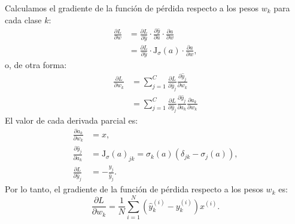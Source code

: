 \documentclass[a4,11pt]{aleph-notas}
\begin{document}
Calculamos el gradiente de la función de pérdida respecto a los pesos $ w_k $ para cada clase $ k $:
$$\begin{aligned}
    \frac{\partial L}{\partial w} & 
    = \frac{\partial L}{\partial \hat{y}}\cdot \frac{\partial \hat{y}}{\partial a} \cdot\frac{\partial a}{\partial w}\\
    &= \frac{\partial L}{\partial \hat{y}}\cdot \text{J}_{\sigma}(a) \cdot\frac{\partial a}{\partial w},
\end{aligned}$$
o, de otra forma:
$$\begin{aligned}
\frac{\partial L}{\partial w_k}  
    &= \sum_{j=1}^C \frac{\partial L}{\partial \hat{y}_j} \frac{\partial \hat{y}_j}{\partial w_k}\\
    &= \sum_{j=1}^C \frac{\partial L}{\partial \hat{y}_j} \frac{\partial \hat{y}_j}{\partial a_k} \frac{\partial a_k}{\partial w_k}
\end{aligned}$$
El valor de cada derivada parcial es:
$$\begin{aligned}
    \frac{\partial a_k}{\partial w_k} &= x,\\
    \frac{\partial \hat{y}_j}{\partial a_k} &= \text{J}_{\sigma}(a)_{jk} = \sigma_k(a)(\delta_{jk} - \sigma_j(a)),\\
    \frac{\partial L}{\partial \hat{y}_j} &= - \frac{y_j}{\hat{y}_j}.
\end{aligned}$$
Por lo tanto, el gradiente de la función de pérdida respecto a los pesos $w_k$ es:
$$
\frac{\partial L}{\partial w_k} = \frac{1}{N} \sum_{i=1}^N \left( \hat{y}_k^{(i)} - y_k^{(i)} \right) x^{(i)}.
$$
\end{document}
